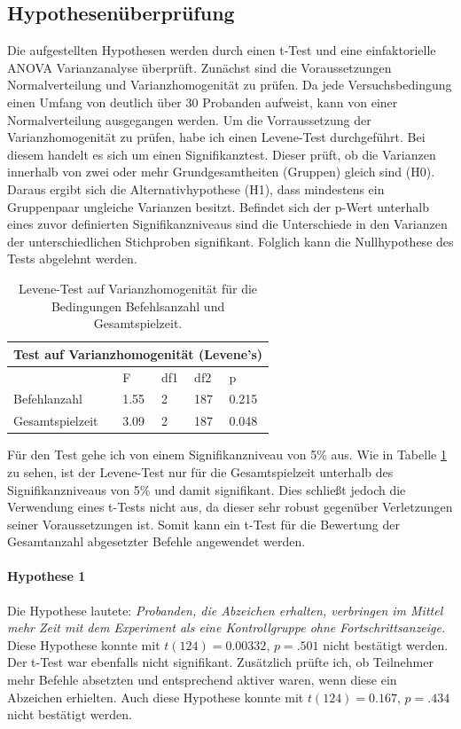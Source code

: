 \subsection{Hypothesenüberprüfung}
Die aufgestellten Hypothesen werden durch einen t-Test und eine einfaktorielle  ANOVA  Varianzanalyse überprüft. Zunächst sind die Voraussetzungen Normalverteilung und Varianzhomogenität zu prüfen. Da jede Versuchsbedingung einen Umfang von deutlich über 30 Probanden aufweist, kann von einer Normalverteilung ausgegangen werden. Um die Vorraussetzung der Varianzhomogenität zu prüfen, habe ich einen Levene-Test durchgeführt. Bei diesem handelt es sich um einen Signifikanztest. Dieser prüft, ob die Varianzen innerhalb von zwei oder mehr Grundgesamtheiten (Gruppen) gleich sind (H0). Daraus ergibt sich die Alternativhypothese (H1), dass mindestens ein Gruppenpaar ungleiche Varianzen besitzt. Befindet sich der p-Wert unterhalb  eines zuvor definierten Signifikanzniveaus sind die Unterschiede in den Varianzen der unterschiedlichen Stichproben signifikant. Folglich kann die Nullhypothese des Tests abgelehnt werden. 
\begin{table}[htbp]
\centering
\begin{tabular}{ |p{2.6cm}||p{2.0cm}|p{2.0cm}|p{2.0cm}|p{2.0cm}| }
 \hline
 \multicolumn{5}{|c|}{Test auf Varianzhomogenität (Levene's)} \\
 \hline
 & F & df1 &df2 &p \\
 \hline
  Befehlanzahl   & 1.55    & 2 &   187 & 0.215\\
  Gesamtspielzeit   & 3.09    & 2 &   187 & 0.048\\
 \hline
\end{tabular}
\caption{Levene-Test auf Varianzhomogenität für die Bedingungen Befehlsanzahl und Gesamtspielzeit.}
\label{levene}
\end{table}
Für den Test gehe ich von einem Signifikanzniveau von 5\% aus. Wie in Tabelle \ref{levene} zu sehen, ist der Levene-Test nur für die Gesamtspielzeit unterhalb des Signifikanzniveaus von 5\% und damit signifikant. Dies schließt jedoch die Verwendung eines t-Tests nicht aus, da dieser sehr robust gegenüber Verletzungen seiner Voraussetzungen ist. Somit kann ein t-Test für die Bewertung der Gesamtanzahl abgesetzter Befehle angewendet werden.

\paragraph{Hypothese 1}
Die Hypothese lautete: \textit{Probanden, die Abzeichen erhalten, verbringen im Mittel mehr Zeit mit dem Experiment als eine Kontrollgruppe ohne Fortschrittsanzeige.} Diese Hypothese konnte mit $t(124)=0.00332$, $p=.501$ nicht bestätigt werden. Der t-Test war ebenfalls nicht signifikant. Zusätzlich prüfte ich, ob Teilnehmer mehr Befehle absetzten und entsprechend aktiver waren, wenn diese ein Abzeichen erhielten. Auch diese Hypothese konnte mit $t(124)=0.167$, $p=.434$ nicht bestätigt werden.


